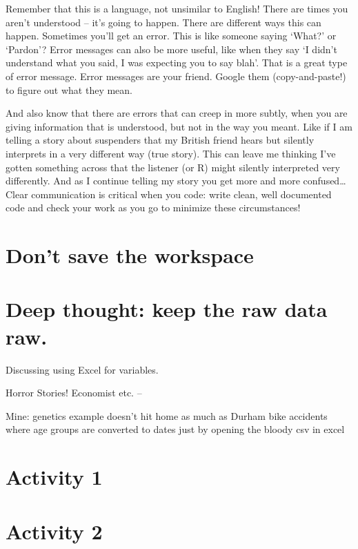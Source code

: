 \documentclass[]{book}
\begin{document}
Remember that this is a language, not unsimilar to English! There are times you aren't understood -- it's going to happen. There are different ways this can happen. Sometimes you'll get an error. This is like someone saying `What?' or `Pardon'? Error messages can also be more useful, like when they say `I didn't understand what you said, I was expecting you to say blah'. That is a great type of error message. Error messages are your friend. Google them (copy-and-paste!) to figure out what they mean.

And also know that there are errors that can creep in more subtly, when you are giving information that is understood, but not in the way you meant. Like if I am telling a story about suspenders that my British friend hears but silently interprets in a very different way (true story). This can leave me thinking I've gotten something across that the listener (or R) might silently interpreted very differently. And as I continue telling my story you get more and more confused\ldots{} Clear communication is critical when you code: write clean, well documented code and check your work as you go to minimize these circumstances!

\hypertarget{dont-save-the-workspace}{%
\section{Don't save the workspace}\label{dont-save-the-workspace}}

\hypertarget{deep-thought-keep-the-raw-data-raw.}{%
\section{Deep thought: keep the raw data raw.}\label{deep-thought-keep-the-raw-data-raw.}}

Discussing using Excel for variables.

Horror Stories! Economist etc. --

Mine: genetics example doesn't hit home as much as Durham bike accidents where age groups are converted to dates just by opening the bloody csv in excel

\hypertarget{activity-1}{%
\section{Activity 1}\label{activity-1}}

\hypertarget{activity-2}{%
\section{Activity 2}\label{activity-2}}
\end{document}
